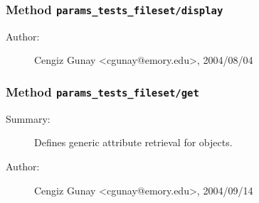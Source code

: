 \subsubsection[Method \texttt{display}]{Method \texttt{params\_tests\_fileset/display}}%
%
\label{ref_params_tests_fileset__display}%
\hypertarget{ref_params_tests_fileset__display}{}%
\begin{description}
%
%
%
%
%
%
%
\item[Author:]%
Cengiz Gunay <cgunay@emory.edu>, 2004/08/04
%
\end{description}
\methodline%
\subsubsection[Method \texttt{get}]{Method \texttt{params\_tests\_fileset/get}}%
%
\label{ref_params_tests_fileset__get}%
\hypertarget{ref_params_tests_fileset__get}{}%
\begin{description}
\item[Summary:]Defines generic attribute retrieval for objects.
%
%
%
%
%
%
%
\item[Author:]%
Cengiz Gunay <cgunay@emory.edu>, 2004/09/14
%
\end{description}
\methodline%

